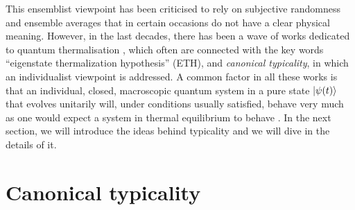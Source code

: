 \indent This ensemblist viewpoint has been criticised \cite{mccrea_1939, TERHAAR1995216, goldstein_gibbs_2020, goldstein_boltzmanns_2001} to rely on subjective randomness and ensemble averages that in certain occasions do not have a clear physical meaning. However, in the last decades, there has been a wave of works dedicated to quantum thermalisation \cite{popescu_foundations_2005, goldstein_canonical_2006, gemmer_thermalization_2006, popescu_entanglement_2006, goldstein_approach_2010, kaufman_quantum_2016, gogolin_equilibration_2016 }, which often are connected with the key words “eigenstate thermalization hypothesis” (ETH), and \textit{canonical typicality}, in which an individualist viewpoint is addressed. A common factor in all these works is that an individual, closed, macroscopic quantum system in a pure state $\mathinner{|{\psi(t)}\rangle}$ that evolves unitarily will, under conditions usually satisfied, behave very much as one would expect a system in thermal equilibrium to behave \cite{goldstein_gibbs_2020}. In the next section, we will introduce the ideas behind typicality and we will dive in the details of it.


\section{Canonical typicality}

